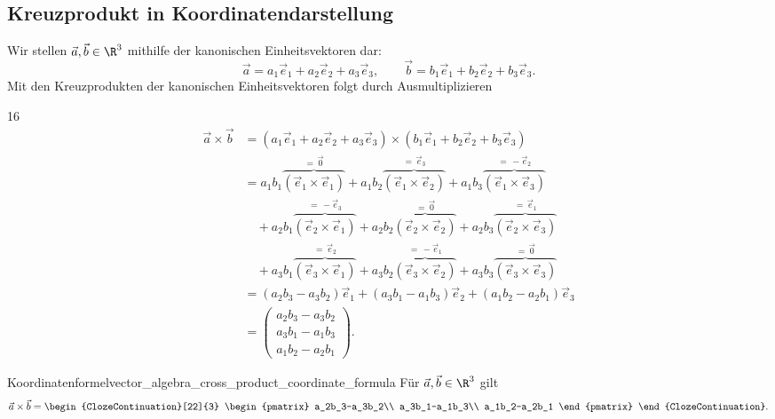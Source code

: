 \subsection{Kreuzprodukt in Koordinatendarstellung}
\label{subsec:vector_algebra_cross_product_coordinates}

Wir stellen $\vec a,\vec b\in\R^3$ mithilfe der kanonischen Einheitsvektoren
dar:
\[
  \vec a=a_1\vec e_1+a_2\vec e_2+a_3\vec e_3,
  \qquad
  \vec b=b_1\vec e_1+b_2\vec e_2+b_3\vec e_3.
\]
Mit den Kreuzprodukten der kanonischen Einheitsvektoren folgt durch
Ausmultiplizieren
\begin{ClozeArea}[34]{16}
  \[
    \begin{aligned}
      \vec a\times\vec b
      &=(a_1\vec e_1+a_2\vec e_2+a_3\vec e_3)
        \times(b_1\vec e_1+b_2\vec e_2+b_3\vec e_3)\\[1.5em]
      &=a_1b_1\overbrace{(\vec e_1\times\vec e_1)}^{=\,\vec 0}
        +a_1b_2\overbrace{(\vec e_1\times\vec e_2)}^{=\,\vec e_3}
        +a_1b_3\overbrace{(\vec e_1\times\vec e_3)}^{=\,-\vec e_2}
        \\[0.9em]
      &\quad
        +a_2b_1\overbrace{(\vec e_2\times\vec e_1)}^{=\,-\vec e_3}
        +a_2b_2\overbrace{(\vec e_2\times\vec e_2)}^{=\,\vec 0}
        +a_2b_3\overbrace{(\vec e_2\times\vec e_3)}^{=\,\vec e_1}
        \\[0.9em]
      &\quad
        +a_3b_1\overbrace{(\vec e_3\times\vec e_1)}^{=\,\vec e_2}
        +a_3b_2\overbrace{(\vec e_3\times\vec e_2)}^{=\,-\vec e_1}
        +a_3b_3\overbrace{(\vec e_3\times\vec e_3)}^{=\,\vec 0}
        \\[1.3em]
      &=(a_2b_3-a_3b_2)\vec e_1
        +(a_3b_1-a_1b_3)\vec e_2
        +(a_1b_2-a_2b_1)\vec e_3\\[1em]
      &=\begin{pmatrix}
          a_2b_3-a_3b_2\\
          a_3b_1-a_1b_3\\
          a_1b_2-a_2b_1
        \end{pmatrix}.
    \end{aligned}
  \]
\end{ClozeArea}

\begin{KeyPointBox}{Koordinatenformel}{vector_algebra_cross_product_coordinate_formula}
  Für $\vec a,\vec b\in\R^3$ gilt
  \[
    \vec a\times\vec b
    =\begin{ClozeContinuation}[22]{3}
      \begin{pmatrix}
        a_2b_3-a_3b_2\\
        a_3b_1-a_1b_3\\
        a_1b_2-a_2b_1
      \end{pmatrix}
    \end{ClozeContinuation}.
  \]
\end{KeyPointBox}

